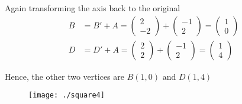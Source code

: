 \documentclass[12pt]{article}
\begin{document}
Again transforming the axis back to the original
\begin{align*}
B &= B'+A = \begin{pmatrix}
2 \\
-2
\end{pmatrix}+\begin{pmatrix}
-1 \\
2
\end{pmatrix} = 
\begin{pmatrix}
1 \\
0
\end{pmatrix}\\
D &= D'+A = \begin{pmatrix}
2 \\
2
\end{pmatrix}+\begin{pmatrix}
-1 \\
2
\end{pmatrix} = 
\begin{pmatrix}
1 \\
4
\end{pmatrix}
\end{align*}

Hence, the other two vertices are $B(1,0) \text{ and } D(1,4)$   

\begin{figure}[!h]
	\begin{center} 
	    \texttt{[image: ./square4]}
	\end{center}
\caption{}
\label{fig:Fig1}
\end{figure}
\end{document}
